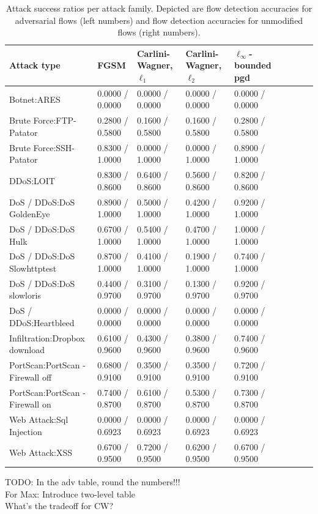 \documentclass[conference]{IEEEtran}
\newcommand\note[2]{{\color{#1}#2}}
\newcommand\todo[1]{{\note{red}{TODO: #1}}}
\begin{document}
\begin{table}
\caption{Attack success ratios per attack family. Depicted are flow detection accuracies for adversarial flows (left numbers) and flow detection accuracies for unmodified flows (right numbers).}
\label{tab:adv_per_family}
\centering
\begin{tabular}{lllllllll}
\toprule
Attack type & FGSM & Carlini-Wagner, $\ell_1$ & Carlini-Wagner, $\ell_2$ & $\ell_\infty$-bounded \gls{pgd} \\
\midrule
Botnet:ARES	&	0.0000 / 0.0000	&	0.0000 / 0.0000	&	0.0000 / 0.0000	&	0.0000 / 0.0000	\\
Brute Force:FTP-Patator	&	0.2800 / 0.5800	&	0.1600 / 0.5800	&	0.1600 / 0.5800	&	0.2800 / 0.5800	\\
Brute Force:SSH-Patator	&	0.8300 / 1.0000	&	0.0000 / 1.0000	&	0.0000 / 1.0000	&	0.8900 / 1.0000	\\
DDoS:LOIT	&	0.8300 / 0.8600	&	0.6400 / 0.8600	&	0.5600 / 0.8600	&	0.8200 / 0.8600	\\
DoS / DDoS:DoS GoldenEye	&	0.8900 / 1.0000	&	0.5000 / 1.0000	&	0.4200 / 1.0000	&	0.9200 / 1.0000	\\
DoS / DDoS:DoS Hulk	&	0.6700 / 1.0000	&	0.5400 / 1.0000	&	0.4700 / 1.0000	&	1.0000 / 1.0000	\\
DoS / DDoS:DoS Slowhttptest	&	0.8700 / 1.0000	&	0.4100 / 1.0000	&	0.1900 / 1.0000	&	0.7400 / 1.0000	\\
DoS / DDoS:DoS slowloris	&	0.4400 / 0.9700	&	0.3100 / 0.9700	&	0.1300 / 0.9700	&	0.9200 / 0.9700	\\
DoS / DDoS:Heartbleed	&	0.0000 / 0.0000	&	0.0000 / 0.0000	&	0.0000 / 0.0000	&	0.0000 / 0.0000	\\
Infiltration:Dropbox download 	&	0.6100 / 0.9600	&	0.4300 / 0.9600	&	0.3800 / 0.9600	&	0.7400 / 0.9600	\\
PortScan:PortScan - Firewall off	&	0.6800 / 0.9100	&	0.3500 / 0.9100	&	0.3500 / 0.9100	&	0.7200 / 0.9100	\\
PortScan:PortScan - Firewall on	&	0.7400 / 0.8700	&	0.6100 / 0.8700	&	0.5300 / 0.8700	&	0.7300 / 0.8700	\\
Web Attack:Sql Injection	&	0.0000 / 0.6923	&	0.0000 / 0.6923	&	0.0000 / 0.6923	&	0.0000 / 0.6923	\\
Web Attack:XSS	&	0.6700 / 0.9500	&	0.7200 / 0.9500	&	0.6200 / 0.9500	&	0.6700 / 0.9500	\\
\bottomrule

\end{tabular}

\todo{In the adv table, round the numbers!!! \\
For Max: Introduce two-level table\\
What's the tradeoff for CW?}
\end{table}
\end{document}
